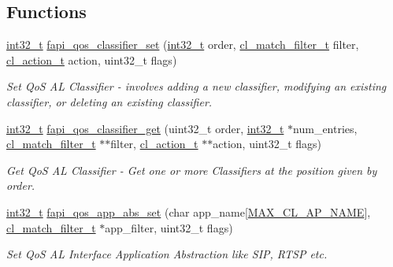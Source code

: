 \subsection*{Functions}
\begin{DoxyCompactItemize}
\item 
\hyperlink{commondefs_8h_a32f2e37ee053cf2ce8ca28d1f74630e5}{int32\-\_\-t} \hyperlink{group__FAPI__QOS__CLASS_ga3a90a0d5b85be195a9b297281d8e1a18}{fapi\-\_\-qos\-\_\-classifier\-\_\-set} (\hyperlink{commondefs_8h_a32f2e37ee053cf2ce8ca28d1f74630e5}{int32\-\_\-t} order, \hyperlink{structcl__match__filter__t}{cl\-\_\-match\-\_\-filter\-\_\-t} filter, \hyperlink{structcl__action__t}{cl\-\_\-action\-\_\-t} action, uint32\-\_\-t flags)
\begin{DoxyCompactList}\small\item\em Set Qo\-S A\-L Classifier -\/ involves adding a new classifier, modifying an existing classifier, or deleting an existing classifier. \end{DoxyCompactList}\item 
\hyperlink{commondefs_8h_a32f2e37ee053cf2ce8ca28d1f74630e5}{int32\-\_\-t} \hyperlink{group__FAPI__QOS__CLASS_gade879fda083234b2979807784e36c779}{fapi\-\_\-qos\-\_\-classifier\-\_\-get} (uint32\-\_\-t order, \hyperlink{commondefs_8h_a32f2e37ee053cf2ce8ca28d1f74630e5}{int32\-\_\-t} $\ast$num\-\_\-entries, \hyperlink{structcl__match__filter__t}{cl\-\_\-match\-\_\-filter\-\_\-t} $\ast$$\ast$filter, \hyperlink{structcl__action__t}{cl\-\_\-action\-\_\-t} $\ast$$\ast$action, uint32\-\_\-t flags)
\begin{DoxyCompactList}\small\item\em Get Qo\-S A\-L Classifier -\/ Get one or more Classifiers at the position given by order. \end{DoxyCompactList}\item 
\hyperlink{commondefs_8h_a32f2e37ee053cf2ce8ca28d1f74630e5}{int32\-\_\-t} \hyperlink{group__FAPI__QOS__CLASS_ga3c3697dfc41749e8d9fd841b5f1956a8}{fapi\-\_\-qos\-\_\-app\-\_\-abs\-\_\-set} (char app\-\_\-name\mbox{[}\hyperlink{group__FAPI__QOS__CLASS_ga078fa167f6c71720c8ca3158564002ae}{M\-A\-X\-\_\-\-C\-L\-\_\-\-A\-P\-\_\-\-N\-A\-M\-E}\mbox{]}, \hyperlink{structcl__match__filter__t}{cl\-\_\-match\-\_\-filter\-\_\-t} $\ast$app\-\_\-filter, uint32\-\_\-t flags)
\begin{DoxyCompactList}\small\item\em Set Qo\-S A\-L Interface Application Abstraction like S\-I\-P, R\-T\-S\-P etc. \end{DoxyCompactList}\item 

\end{DoxyCompactItemize}
